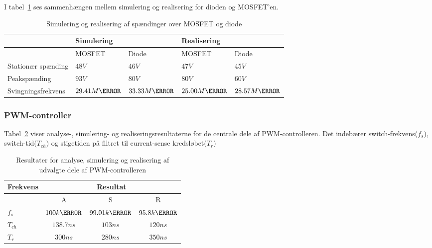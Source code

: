 \noindent I tabel~\ref{tab:MOSDIODE} ses sammenhængen mellem simulering og realisering for dioden og MOSFET'en.
\begin{table}[H] 			
	\centering
	\begin{tabularx}{\textwidth}{|X|l|l|l|l|}
		\hline
		& \multicolumn{2}{|X|}{\textbf{Simulering}} & \multicolumn{2}{|X|}{\textbf{Realisering}} \\ \hline
		& MOSFET & Diode & MOSFET & Diode \\ \hline
		Stationær spænding & $48V$ & $46V$ & $47V$ & $45V$ \\ \hline
		Peakspænding & $93V$ & $80V$ & $80V$ & $60V$ \\ \hline
		Svingningsfrekvens & $29.41M\hertz$ & $33.33M\hertz$ & $25.00M\hertz$ & $28.57M\hertz$ \\ \hline
	\end{tabularx}
	\caption{Simulering og realisering af spændinger over MOSFET og diode}
	\label{tab:MOSDIODE}
\end{table}

\subsubsection{PWM-controller}
\noindent Tabel~\ref{tab:resultat_PWM} viser analyse-, simulering- og realiseringsresultaterne for de centrale dele af PWM-controlleren. Det indebærer switch-frekvens($f_s$), switch-tid($T_{ch})$ og stigetiden på filtret til current-sense kredsløbet($T_r$)
\begin{table}[H] 			
	\centering
	\begin{tabularx}{\textwidth}{|X|c|c|c|}
		\hline
		\textbf{Frekvens} & \multicolumn{3}{|c|}{\textbf{Resultat}} 		\\ \hline
		& A & S & R 									\\ \hline 
		$f_s$ & $100k\hertz$ & $99.01k\hertz$ & $95.8k\hertz$ 									\\ \hline
		$T_{ch}$ & $138.7ns$ & $103ns$ & $120ns$ 									\\ \hline
		$T_r$ & $300ns$ & $280ns$ & $350ns$ 									\\ \hline
	\end{tabularx}
	\caption{Resultater for analyse, simulering og realisering af udvalgte dele af PWM-controlleren}
	\label{tab:resultat_PWM}
\end{table}


